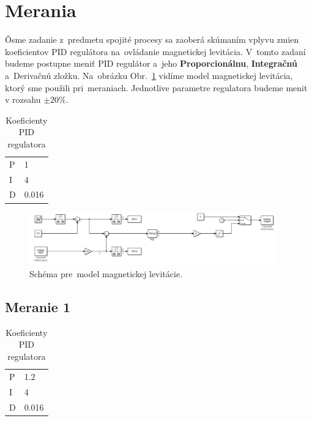 \documentclass{article}
\begin{document}
\clearpage

\section{Merania}
\label{sec:merania}

Ôsme zadanie z~predmetu spojité procesy sa zaoberá skúmaním vplyvu zmien koeficientov PID regulátora
na~ovládanie magnetickej levitácia. V~tomto zadaní budeme postupne meniť PID regulátor a~jeho \textbf{Proporcionálnu},
\textbf{Integračnú} a~Derivačnú zložku. Na~obrázku Obr.~\ref{fig:schema} vidíme model magnetickej levitácia,
ktorý sme použili pri~meraniach. Jednotlive parametre regulatora budeme menit v rozsahu $\pm20\%$.

\begin{table}[!htbp]
	\caption{Koeficienty PID regulatora}
	\label{tab:t0}
	\begin{center}
		\begin{tabular}[c]{|l|l|}
			\hline

			P & 1 \\
			I & 4 \\
			D & 0.016 \\
			\hline
		\end{tabular}
	\end{center}
\end{table}

\begin{figure}[!htbp]
	\begin{center}
		\includegraphics[width=0.95\textwidth]{include/schema.png}
	\end{center}
	\caption{Schéma pre~model magnetickej levitácie.}
	\label{fig:schema}
\end{figure}

\subsection{Meranie 1}
\label{sec:meranie1}

\begin{table}[!htbp]
	\caption{Koeficienty PID regulatora}
	\label{tab:t1}
	\begin{center}
		\begin{tabular}[c]{|l|l|}
			\hline
			P & 1.2 \\
			I & 4 \\
			D & 0.016 \\
			\hline
		\end{tabular}
	\end{center}
\end{table}
\end{document}
